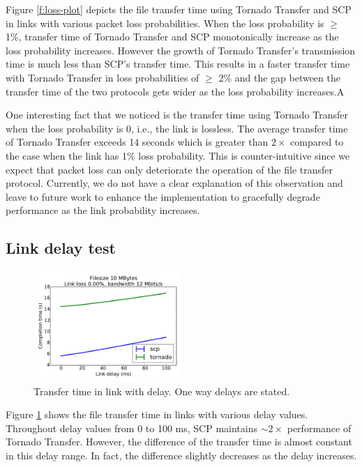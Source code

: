 \documentclass{sig-alternate-10pt}
\begin{document}
Figure \ref{f:loss-plot} depicts the file transfer time using Tornado Transfer and SCP in
links with various packet loss probabilities. When the loss probability is
$\geq$ 1\%, transfer time of Tornado Transfer and SCP monotonically increase as the loss
probability increases. However the growth of Tornado Transfer's transmission time is much
less than SCP's transfer time. This results in a faster transfer time with
Tornado Transfer in loss probabilities of $\geq$ 2\% and the gap between the transfer time
of the two protocols gets wider as the loss probability increases.A

One interesting fact that we noticed is the transfer time using Tornado Transfer when
the loss probability is 0, i.e., the link is lossless. The average transfer time of
Tornado Transfer exceeds 14 seconds which is greater than $2\times$ compared to the case
when the link has 1\% loss probability. This is counter-intuitive since we
expect that packet loss can only deteriorate the operation of the file transfer
protocol. Currently, we do not have a clear explanation of this observation and
leave to future work to enhance the implementation to gracefully degrade
performance as the link probability increases.


\subsection{Link delay test}

\begin{figure}[t]
  \centering
  \includegraphics[width=0.5\textwidth]{delay-plot}
  \caption{Transfer time in link with delay. One way delays are stated.}
  \label{f:delay-plot}
\end{figure}

Figure \ref{f:delay-plot} shows the file transfer time in links with various
delay values. Throughout delay values from 0 to 100 ms, SCP maintains $\sim
2\times$ performance of Tornado Transfer. However, the difference of the transfer time is
almost constant in this delay range. In fact, the difference slightly decreases
as the delay increases. 
\end{document}
